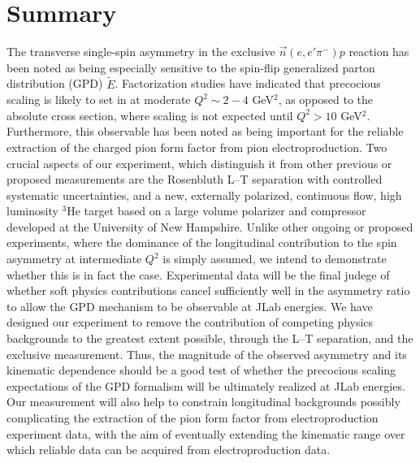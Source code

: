 \documentclass{article}
\begin{document}




\section{Summary}

The transverse single-spin asymmetry in the exclusive $\vec{n}(e,e'\pi^-)p$
reaction has been noted as being
especially sensitive to the spin-flip generalized parton distribution (GPD)
$\tilde{E}$.  Factorization studies have indicated that precocious scaling
is likely to set in at moderate $Q^2\sim 2-4$ GeV$^2$, as opposed to the
absolute cross section, where scaling is not expected until $Q^2>10$ GeV$^2$.
Furthermore, this observable has been noted as being important for the reliable
extraction of the charged pion form factor from pion electroproduction.  Two
crucial aspects of our experiment, which distinguish it from other previous or
proposed measurements are the Rosenbluth L--T separation with controlled
systematic uncertainties, and a new, externally polarized, continuous flow,
high luminosity $^3$He target based on a large volume polarizer and compressor
developed at the University of New Hampshire.  Unlike other ongoing or proposed
experiments, where the dominance of the longitudinal contribution to the spin
asymmetry at intermediate $Q^2$ is simply assumed, we intend to demonstrate
whether this is in fact the case.  Experimental data will be the final judege
of whether soft physics contributions cancel sufficiently well in the asymmetry
ratio to allow the GPD mechanism to be observable at JLab energies.  We have
designed our experiment to remove the contribution of competing physics
backgrounds to the greatest extent possible, through the L--T separation, and
the exclusive measurement.  Thus, the magnitude of the observed asymmetry and
its kinematic dependence should be a good test of whether the precocious
scaling expectations of the GPD formalism will be ultimately realized at JLab
energies.  Our measurement will also help to constrain longitudinal backgrounds
possibly complicating the extraction of the pion form factor from
electroproduction experiment data, with the aim of eventually extending the
kinematic range over which reliable data can be acquired from electroproduction
data.



\newpage

 
\newpage
%
\end{document}
